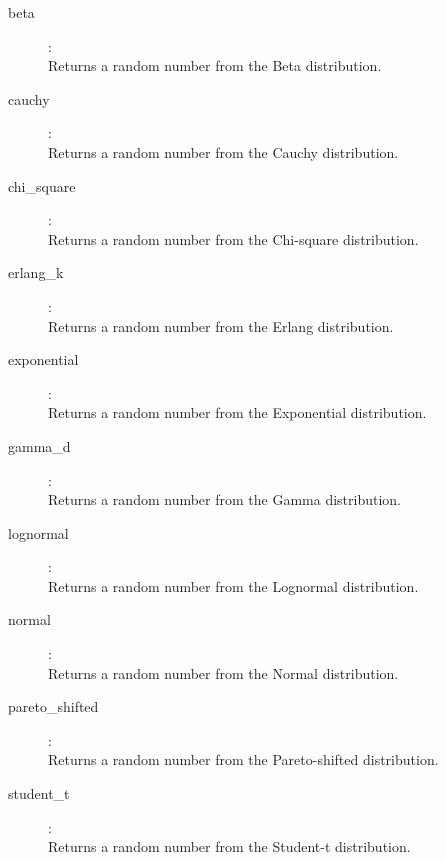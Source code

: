 \begin{description}
\item[beta]:  \\
    Returns a random number from the Beta distribution.

\item[cauchy]:  \\
    Returns a random number from the Cauchy distribution.

\item[chi\_square]:  \\
    Returns a random number from the Chi-square distribution.

\item[erlang\_k]:  \\
    Returns a random number from the Erlang distribution.

\item[exponential]:  \\
    Returns a random number from the Exponential distribution.

\item[gamma\_d]:  \\
    Returns a random number from the Gamma distribution.

\item[lognormal]:  \\
    Returns a random number from the Lognormal distribution.

\item[normal]:  \\
    Returns a random number from the Normal distribution.

\item[pareto\_shifted]:  \\
    Returns a random number from the Pareto-shifted distribution.

\item[student\_t]:  \\
    Returns a random number from the Student-t distribution.


\end{description}
